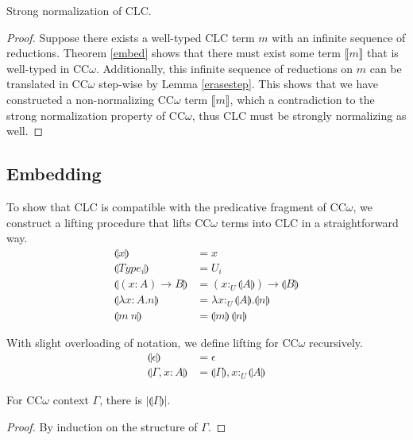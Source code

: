 \documentclass[sigplan,screen,review,anonymous]{acmart}
\newcommand{\pure}[1]{|#1|}
\newcommand{\utype}{:_{\scriptscriptstyle U}}
\newcommand{\erase}[1]{\llbracket #1 \rrbracket}
\newcommand{\lift}[1]{\llparenthesis #1 \rrparenthesis}
\begin{document}
\begin{theorem}
  Strong normalization of CLC.
\end{theorem}
\begin{proof}
  Suppose there exists a well-typed CLC term $m$ with an infinite sequence of reductions. Theorem \ref{embed} shows that there must exist some term $\erase{m}$ that is well-typed in CC$\omega$. Additionally, this infinite sequence of reductions on $m$ can be translated in CC$\omega$ step-wise by Lemma \ref{erasestep}. This shows that we have constructed a non-normalizing CC$\omega$ term $\erase{m}$, which a contradiction to the strong normalization property of CC$\omega$, thus CLC must be strongly normalizing as well.
\end{proof}

\subsection{Embedding}
To show that CLC is compatible with the predicative fragment of CC$\omega$, we construct a lifting procedure that lifts CC$\omega$ terms into CLC in a straightforward way.
\begin{align*}
  \lift{x}                     & = x                                        \\
  \lift{Type_i}                & = U_i                                      \\
  \lift{(x : A) \rightarrow B} & = (x \utype \lift{A}) \rightarrow \lift{B} \\
  \lift{\lambda x : A.n}       & = \lambda x\utype\lift{A}.\lift{n}         \\
  \lift{m\ n}                  & = \lift{m}\ \lift{n}
\end{align*}

With slight overloading of notation, we define lifting for CC$\omega$ recursively.
\begin{align*}
  \lift{\epsilon}      & = \epsilon                         \\
  \lift{\Gamma, x : A} & = \lift{\Gamma}, x \utype \lift{A}
\end{align*}

\begin{lemma}
  For CC$\omega$ context $\Gamma$, there is $\pure{\lift{\Gamma}}$.
\end{lemma}
\begin{proof}
  By induction on the structure of $\Gamma$.
\end{proof}
\end{document}
